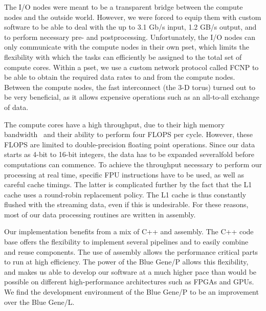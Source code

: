 \documentclass{sig-alternate}
\begin{document}
The I/O nodes were meant to be a transparent bridge between the compute nodes and the outside world. However, we were forced to equip them with custom software to be able to deal with the up to 3.1 Gb/s input, 1.2 GB/s output, and to perform necessary pre- and postprocessing. Unfortunately, the I/O nodes can only communicate with the compute nodes in their own pset, which limits the flexibility with which the tasks can efficiently be assigned to the total set of compute cores. Within a pset, we use a custom network protocol called FCNP to be able to obtain the required data rates to and from the compute nodes. Between the compute nodes, the fast interconnect (the 3-D torus) turned out to be very beneficial, as it allows expensive operations such as an all-to-all exchange of data.

The compute cores have a high throughput, due to their high memory bandwidth~\cite{Nieuwpoort:09} and their ability to perform four FLOPS per cycle. However, these FLOPS are limited to double-precision floating point operations. Since our data starts as 4-bit to 16-bit integers, the data has to be expanded severalfold before computations can commence. To achieve the throughput necessary to perform our processing at real time, specific FPU instructions have to be used, as well as careful cache timings. The latter is complicated further by the fact that the L1 cache uses a round-robin replacement policy. The L1 cache is thus constantly flushed with the streaming data, even if this is undesirable. For these reasons, most of our data processing routines are written in assembly.


Our implementation benefits from a mix of C++ and assembly. The C++ code base offers the flexibility
to implement several pipelines and to easily combine and reuse components. The use of assembly allows
the performance critical parts to run at high efficiency. The power of the Blue Gene/P allows this
flexibility, and makes us able to develop our software at a much higher pace than would be possible
on different high-performance architectures such as FPGAs and GPUs. We find the development environment
of the Blue Gene/P to be an improvement over the Blue Gene/L.
\end{document}
